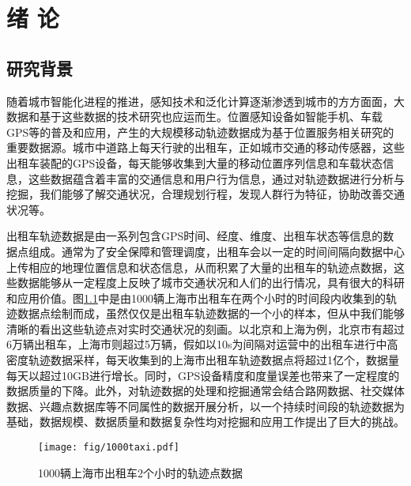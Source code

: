 \chapter{绪\hskip 0.4cm 论}
\label{chap1}

\section{研究背景}

随着城市智能化进程的推进，感知技术和泛化计算逐渐渗透到城市的方方面面，大数据和基于这些数据的技术研究也应运而生。位置感知设备如智能手机、车载GPS等的普及和应用，产生的大规模移动轨迹数据成为基于位置服务相关研究的重要数据源。城市中道路上每天行驶的出租车，正如城市交通的移动传感器，这些出租车装配的GPS设备，每天能够收集到大量的移动位置序列信息和车载状态信息，这些数据蕴含着丰富的交通信息和用户行为信息，通过对轨迹数据进行分析与挖掘，我们能够了解交通状况，合理规划行程，发现人群行为特征，协助改善交通状况等。

出租车轨迹数据是由一系列包含GPS时间、经度、维度、出租车状态等信息的数据点组成。通常为了安全保障和管理调度，出租车会以一定的时间间隔向数据中心上传相应的地理位置信息和状态信息，从而积累了大量的出租车的轨迹点数据，这些数据能够从一定程度上反映了城市交通状况和人们的出行情况，具有很大的科研和应用价值。图\ref{fig:1000taxi_pdf}中是由1000辆上海市出租车在两个小时的时间段内收集到的轨迹数据点绘制而成，虽然仅仅是出租车轨迹数据的一个小的样本，但从中我们能够清晰的看出这些轨迹点对实时交通状况的刻画。以北京和上海为例，北京市有超过6万辆出租车，上海市则超过5万辆，假如以10s为间隔对运营中的出租车进行中高密度轨迹数据采样，每天收集到的上海市出租车轨迹数据点将超过1亿个，数据量每天以超过10GB进行增长。同时，GPS设备精度和度量误差也带来了一定程度的数据质量的下降。此外，对轨迹数据的处理和挖掘通常会结合路网数据、社交媒体数据、兴趣点数据库等不同属性的数据开展分析，以一个持续时间段的轨迹数据为基础，数据规模、数据质量和数据复杂性均对挖掘和应用工作提出了巨大的挑战。


\begin{figure}[!htb]
\centering
\texttt{[image: fig/1000taxi.pdf]}
\caption{1000辆上海市出租车2个小时的轨迹点数据} %
\label{fig:1000taxi_pdf}
\end{figure}

